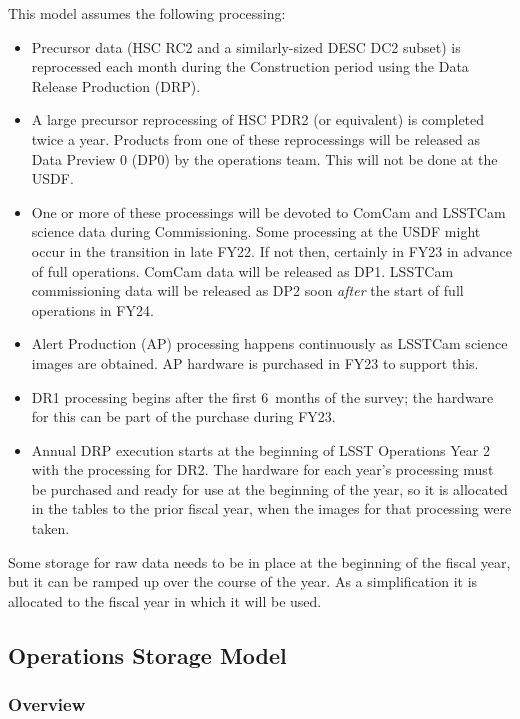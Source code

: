 This model assumes the following processing:
\begin{itemize}
\item Precursor data (HSC RC2 and a similarly-sized DESC DC2 subset) is reprocessed each month during the Construction period using the Data Release Production (DRP).
\item A large precursor reprocessing of HSC PDR2 (or equivalent) is completed twice a year.
Products from one of these reprocessings will be released as Data Preview 0 (DP0) by the operations team. This will not be done at the \gls{USDF}.
\item One or more of these processings will be devoted to ComCam and LSSTCam science data during Commissioning. Some processing at the \gls{USDF} might occur in the
transition in late FY22. If not then, certainly in FY23 in advance of full operations. ComCam data will be released as DP1. LSSTCam commissioning data will be released as DP2 soon {\it after} the start of full operations in FY24.
\item Alert Production (AP) processing happens continuously as LSSTCam science images are obtained.
AP hardware is purchased in FY23 to support this.
\item DR1 processing begins after the first 6~months of the survey; the hardware for this can be part of the purchase during FY23.
\item Annual DRP execution starts at the beginning of LSST Operations Year 2 with the processing for DR2.
The hardware for each year's processing must be purchased and ready for use at the beginning of the year, so it is allocated in the tables to the prior fiscal year, when the images for that processing were taken.

\end{itemize}

Some storage for raw data needs to be in place at the beginning of the fiscal
year, but it can be ramped up over the course of the year.
As a simplification it is allocated to the fiscal year in which it will be used.

\subsection{Operations Storage Model}

\subsubsection{Overview}

